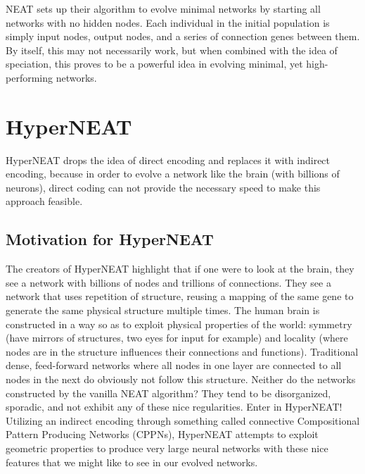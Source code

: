 \documentclass[journal, a4paper]{IEEEtran}
\begin{document}
NEAT sets up their algorithm to evolve minimal networks by starting all networks with no hidden nodes. Each individual in the initial population is simply input nodes, output nodes, and a series of connection genes between them. By itself, this may not necessarily work, but when combined with the idea of speciation, this proves to be a powerful idea in evolving minimal, yet high-performing networks. \cite{cite02}




\section{HyperNEAT}

HyperNEAT drops the idea of direct encoding and replaces it with indirect encoding, because in order to evolve a network like the brain (with billions of neurons), direct coding can not provide the necessary speed to make this approach feasible.

\subsection{Motivation for HyperNEAT}

The creators of HyperNEAT highlight that if one were to look at the brain, they see a network with billions of nodes and trillions of connections. They see a network that uses repetition of structure, reusing a mapping of the same gene to generate the same physical structure multiple times. The human brain is constructed in a way so as to exploit physical properties of the world: symmetry (have mirrors of structures, two eyes for input for example) and locality (where nodes are in the structure influences their connections and functions).
Traditional dense, feed-forward networks where all nodes in one layer are connected to all nodes in the next do obviously not follow this structure. Neither do the networks constructed by the vanilla NEAT algorithm? They tend to be disorganized, sporadic, and not exhibit any of these nice regularities.
Enter in HyperNEAT! Utilizing an indirect encoding through something called connective Compositional Pattern Producing Networks (CPPNs), HyperNEAT attempts to exploit geometric properties to produce very large neural networks with these nice features that we might like to see in our evolved networks. \cite{cite03}
\end{document}
